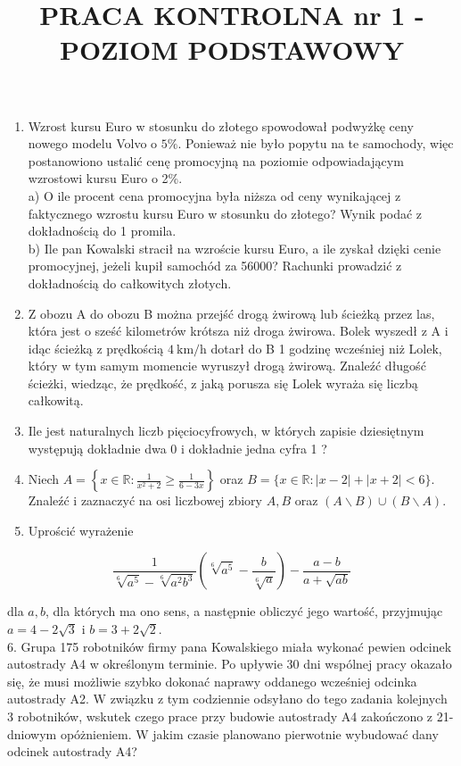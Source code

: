 \documentclass[10pt]{article}
\title{PRACA KONTROLNA nr 1 - POZIOM PODSTAWOWY }
\author{}
\date{}
\begin{document}
\maketitle
\begin{enumerate}
  \item Wzrost kursu Euro w stosunku do złotego spowodował podwyżkę ceny nowego modelu Volvo o $5 \%$. Ponieważ nie było popytu na te samochody, więc postanowiono ustalić cenę promocyjną na poziomie odpowiadającym wzrostowi kursu Euro o 2\%.\\
a) O ile procent cena promocyjna była niższa od ceny wynikającej z faktycznego wzrostu kursu Euro w stosunku do złotego? Wynik podać z dokładnością do 1 promila.\\
b) Ile pan Kowalski stracił na wzroście kursu Euro, a ile zyskał dzięki cenie promocyjnej, jeżeli kupił samochód za 56000? Rachunki prowadzić z dokładnością do całkowitych złotych.
  \item Z obozu A do obozu B można przejść drogą żwirową lub ścieżką przez las, która jest o sześć kilometrów krótsza niż droga żwirowa. Bolek wyszedł z A i idąc ścieżką z prędkością $4 \mathrm{~km} / \mathrm{h}$ dotarł do B 1 godzinę wcześniej niż Lolek, który w tym samym momencie wyruszył drogą żwirową. Znaleźć długość ścieżki, wiedząc, że prędkość, z jaką porusza się Lolek wyraża się liczbą całkowitą.
  \item Ile jest naturalnych liczb pięciocyfrowych, w których zapisie dziesiętnym występują dokładnie dwa 0 i dokładnie jedna cyfra 1 ?
  \item Niech $A=\left\{x \in \mathbb{R}: \frac{1}{x^{2}+2} \geqslant \frac{1}{6-3 x}\right\}$ oraz $B=\{x \in \mathbb{R}:|x-2|+|x+2|<6\}$. Znaleźć i zaznaczyć na osi liczbowej zbiory $A, B$ oraz $(A \backslash B) \cup(B \backslash A)$.
  \item Uprościć wyrażenie
\end{enumerate}

$$
\frac{1}{\sqrt[6]{a^{5}}-\sqrt[6]{a^{2} b^{3}}}\left(\sqrt[6]{a^{5}}-\frac{b}{\sqrt[6]{a}}\right)-\frac{a-b}{a+\sqrt{a b}}
$$

dla $a, b$, dla których ma ono sens, a następnie obliczyć jego wartość, przyjmując $a=4-2 \sqrt{3}$ i $b=3+2 \sqrt{2}$.\\
6. Grupa 175 robotników firmy pana Kowalskiego miała wykonać pewien odcinek autostrady A4 w określonym terminie. Po upływie 30 dni wspólnej pracy okazało się, że musi możliwie szybko dokonać naprawy oddanego wcześniej odcinka autostrady A2. W związku z tym codziennie odsyłano do tego zadania kolejnych 3 robotników, wskutek czego prace przy budowie autostrady A4 zakończono z 21-dniowym opóżnieniem. W jakim czasie planowano pierwotnie wybudować dany odcinek autostrady A4?
\end{document}
